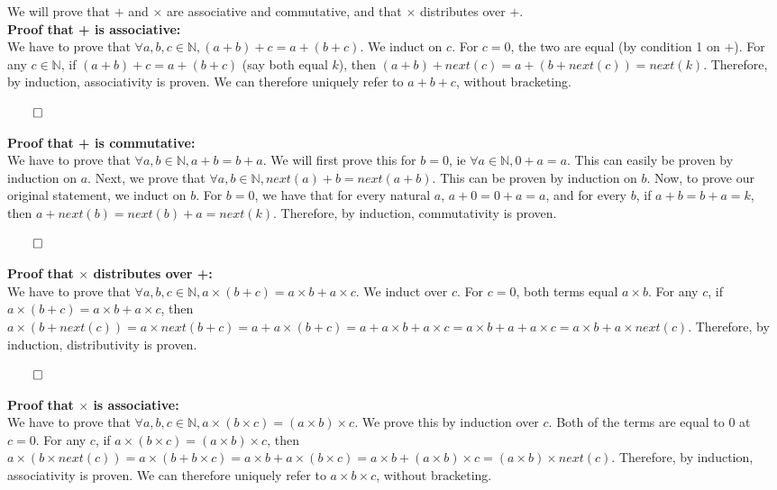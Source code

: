 \documentclass[12pt]{report}
\begin{document}
We will prove that $+$ and $\times$ are associative and commutative, and that $\times$ distributes over $+$.\\
\textbf{Proof that + is associative:}\\
We have to prove that $\forall a, b, c \in \mathbb{N}, (a + b) + c = a + (b + c)$. We induct on $c$. For $c = 0$, the two are equal (by condition 1 on $+$). For any $c \in \mathbb{N}$, if $(a + b) + c = a + (b + c)$ (say both equal $k$), then $(a + b) + next(c) = a + (b + next(c)) = next(k)$. Therefore, by induction, associativity is proven. We can therefore uniquely refer to $a + b + c$, without bracketing. 

$\qed$

\textbf{Proof that + is commutative:}\\
We have to prove that $\forall a, b \in \mathbb{N}, a + b = b + a$. We will first prove this for $b = 0$, ie $\forall a \in \mathbb{N}, 0 + a = a$. This can easily be proven by induction on $a$. Next, we prove that $\forall a, b \in \mathbb{N}, next(a) + b = next(a + b)$. This can be proven by induction on $b$. Now, to prove our original statement, we induct on $b$. For $b = 0$, we have that for every natural $a$, $a + 0 = 0 + a = a$, and for every $b$, if $a + b = b + a = k$, then $a + next(b) = next(b) + a = next(k)$. Therefore, by induction, commutativity is proven.

$\qed$

\textbf{Proof that $\times$ distributes over +:}\\
We have to prove that $\forall a, b, c \in \mathbb{N}, a \times (b + c) = a \times b + a \times c$. We induct over $c$. For $c = 0$, both terms equal $a \times b$. For any $c$, if $a \times (b + c) = a \times b + a \times c$, then $a \times (b + next(c)) = a \times next(b + c) = a + a \times (b + c) = a + a \times b + a \times c = a \times b + a + a \times c = a \times b + a \times next(c)$. Therefore, by induction, distributivity is proven.

$\qed$

\textbf{Proof that $\times$ is associative:}\\
We have to prove that $\forall a, b, c \in \mathbb{N}, a \times (b \times c) = (a \times b) \times c$. We prove this by induction over $c$. Both of the terms are equal to $0$ at $c = 0$. For any $c$, if $a \times (b \times c) = (a \times b) \times c$, then $a \times (b \times next(c)) = a \times (b + b \times c) = a \times b + a \times (b \times c) = a \times b + (a \times b) \times c = (a \times b) \times next(c)$. Therefore, by induction, associativity is proven. We can therefore uniquely refer to $a \times b \times c$, without bracketing.
\end{document}
